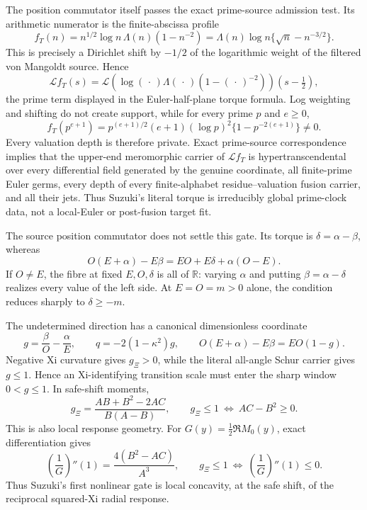 \documentclass[11pt]{article}
\theoremstyle{definition}
\theoremstyle{remark}
\newcommand{\R}{\mathbb R}
\begin{document}
The position commutator itself passes the exact prime-source admission test.  Its arithmetic
numerator is the finite-abscissa profile
\[
 f_T(n)=n^{1/2}\log n\,\Lambda(n)(1-n^{-2})
       =\Lambda(n)\log n\{\sqrt n-n^{-3/2}\}.
\]
This is precisely a Dirichlet shift by $-1/2$ of the logarithmic weight of the filtered von
Mangoldt source.  Hence
\[
 \mathcal Lf_T(s)
 =\mathcal L\!\left(\log(\,\cdot\,)\Lambda(\,\cdot\,)
        (1-(\,\cdot\,)^{-2})\right)(s-\tfrac12),
\]
the prime term displayed in the Euler-half-plane torque formula.  Log weighting and shifting do
not create support, while for every prime $p$ and $e\geq0$,
\[
 f_T(p^{e+1})
 =p^{(e+1)/2}(e+1)(\log p)^2
    \{1-p^{-2(e+1)}\}\ne0.
\]
Every valuation depth is therefore private.  Exact prime-source correspondence implies that the
upper-end meromorphic carrier of $\mathcal Lf_T$ is hypertranscendental over every differential
field generated by the genuine coordinate, all finite-prime Euler germs, every depth of every
finite-alphabet residue--valuation fusion carrier, and all their jets.  Thus Suzuki's literal
torque is irreducibly global prime-clock data, not a local-Euler or post-fusion target fit.

The source position commutator does not settle this gate.  Its torque is
$\delta=\alpha-\beta$, whereas
\[
 O(E+\alpha)-E\beta
   =EO+E\delta+\alpha(O-E).
 \tag{7.2i}
\]
If $O\ne E$, the fibre at fixed $E,O,\delta$ is all of $\R$: varying $\alpha$ and putting
$\beta=\alpha-\delta$ realizes every value of the left side.  At $E=O=m>0$ alone, the condition
reduces sharply to $\delta\geq-m$.

The undetermined direction has a canonical dimensionless coordinate
\[
 g=\frac{\beta}{O}-\frac{\alpha}{E},\qquad
 q=-2(1-\kappa^2)g,\qquad
 O(E+\alpha)-E\beta=EO(1-g).
 \tag{7.2j}
\]
Negative Xi curvature gives $g_\Xi>0$, while the literal all-angle Schur carrier gives
$g\leq1$.  Hence an Xi-identifying transition scale must enter the sharp window
$0<g\leq1$.  In safe-shift moments,
\[
 g_\Xi=\frac{AB+B^2-2AC}{B(A-B)},\qquad
 g_\Xi\leq1\ \Longleftrightarrow\ AC-B^2\geq0.
 \tag{7.2k}
\]
This is also local response geometry.  For
$G(y)=\frac12\Re M_0(y)$, exact differentiation gives
\[
 \left(\frac1G\right)''(1)=\frac{4(B^2-AC)}{A^3},\qquad
 g_\Xi\leq1\ \Longleftrightarrow\
 \left(\frac1G\right)''(1)\leq0.
 \tag{7.2l}
\]
Thus Suzuki's first nonlinear gate is local concavity, at the safe shift, of the reciprocal
squared-Xi radial response.
\end{document}
